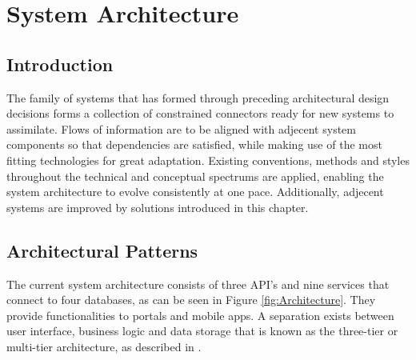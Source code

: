 \graphicspath{{Chapter3/Figs/Vector/}{Chapter3/Figs/}}

%
\chapter{System Architecture}
\section{Introduction}
The family of systems that has formed through preceding architectural design decisions forms a collection of constrained connectors ready for new systems to assimilate. Flows of information are to be aligned with adjecent system components so that dependencies are satisfied, while making use of the most fitting technologies for great adaptation. Existing conventions, methods and styles throughout the technical and conceptual spectrums are applied, enabling the system architecture to evolve consistently at one pace. Additionally, adjecent systems are improved by solutions introduced in this chapter.

%
\section{Architectural Patterns}
The current system architecture consists of three API's and nine services that connect to four databases, as can be seen in Figure \ref{fig:Architecture}. They provide functionalities to portals and mobile apps. A separation exists between user interface, business logic and data storage that is known as the three-tier or multi-tier architecture, as described in \cite{IBM-3-tier}.

